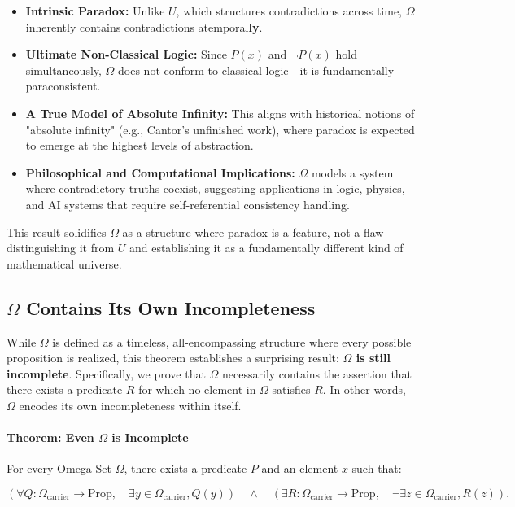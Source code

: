\documentclass[12pt]{article}
\begin{document}
\begin{itemize}
    \item \textbf{Intrinsic Paradox:} Unlike \( U \), which structures contradictions across time, \( \Omega \) inherently contains contradictions atemporal\textbf{ly}. 
    \item \textbf{Ultimate Non-Classical Logic:} Since \( P(x) \) and \( \neg P(x) \) hold simultaneously, \( \Omega \) does not conform to classical logic—it is fundamentally paraconsistent.
    \item \textbf{A True Model of Absolute Infinity:} This aligns with historical notions of "absolute infinity" (e.g., Cantor’s unfinished work), where paradox is expected to emerge at the highest levels of abstraction.
    \item \textbf{Philosophical and Computational Implications:} \( \Omega \) models a system where contradictory truths coexist, suggesting applications in logic, physics, and AI systems that require self-referential consistency handling.
\end{itemize}

This result solidifies \( \Omega \) as a structure where paradox is a feature, not a flaw—distinguishing it from \( U \) and establishing it as a fundamentally different kind of mathematical universe.


\subsection{\( \Omega \) Contains Its Own Incompleteness}

While \( \Omega \) is defined as a timeless, all-encompassing structure where every possible proposition is realized, this theorem establishes a surprising result: \textbf{\( \Omega \) is still incomplete}. Specifically, we prove that \( \Omega \) necessarily contains the assertion that there exists a predicate \( R \) for which no element in \( \Omega \) satisfies \( R \). In other words, \( \Omega \) encodes its own incompleteness within itself.

\paragraph{Theorem: Even \( \Omega \) is Incomplete}
For every Omega Set \( \Omega \), there exists a predicate \( P \) and an element \( x \) such that:

\begin{equation}
    \left( \forall Q: \Omega_{\text{carrier}} \to \text{Prop}, \quad
    \exists y \in \Omega_{\text{carrier}}, Q(y) \right) \quad \wedge \quad
    \left( \exists R: \Omega_{\text{carrier}} \to \text{Prop}, \quad
    \neg \exists z \in \Omega_{\text{carrier}}, R(z) \right).
\end{equation}
\end{document}
